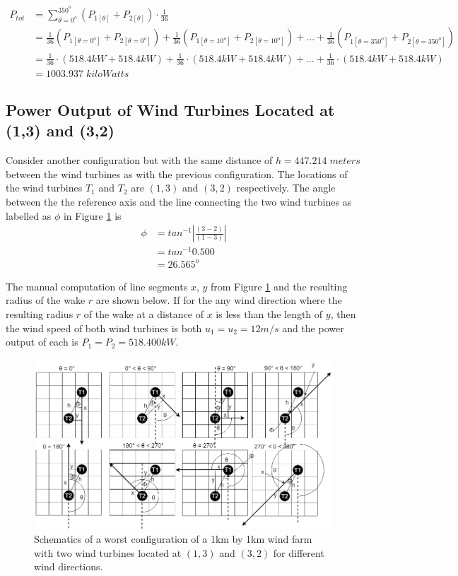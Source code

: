     \begin{align*}
        P_{tot}
        &= \sum_{\theta=0^o}^{350^o} \left( P_{1[\theta]} + P_{2[\theta]} \right) \cdot \frac{1}{36} \\
        &= \frac{1}{36}\left( P_{1[\theta=0^o]} + P_{2[\theta=0^o]} \right) + \frac{1}{36}\left( P_{1[\theta=10^o]} + P_{2[\theta=10^o]} \right) +...+ \frac{1}{36}\left( P_{1[\theta=350^o]} + P_{2[\theta=350^o]} \right) \\
        &= \frac{1}{36}\cdot\left( 518.4kW + 518.4kW \right) + \frac{1}{36}\cdot\left( 518.4kW + 518.4kW \right) +...+ \frac{1}{36}\cdot\left(  518.4kW + 518.4kW \right) \\
        &=1003.937\;kiloWatts
    \end{align*}
    
\subsection{Power Output of Wind Turbines Located at (1,3) and (3,2)}   
    Consider another configuration but with the same distance of $h=447.214\;meters$ between the wind turbines as with the previous configuration. The locations of the wind turbines $T_1$ and $T_2$ are $(1,3)$ and $(3,2)$ respectively. The angle between the the reference axis and the line connecting the two wind turbines as labelled as $\phi$ in Figure \ref{sampleSmall5} is
    \begin{align*}
    	\phi
    	&=tan^{-1}\left| \frac{(3-2)}{(1-3)} \right| \\
    	&=tan^{-1} 0.500 \\
    	&=26.565^o
    \end{align*}
    
    The manual computation of line segments $x$, $y$ from Figure \ref{sampleSmall5} and the resulting radius of the wake $r$ are shown below. If for the any wind direction where the resulting radius $r$ of the wake at a distance of $x$ is less than the length of $y$, then the wind speed of both wind turbines is both $u_1=u_2=12m/s$ and the power output of each is $P_1=P_2=518.400kW$.
    
    \begin{figure}[H]
        \centering
        \includegraphics[width=\linewidth]{Figures/1332.png}
        \caption{Schematics of a worst configuration of a 1km by 1km wind farm with two wind turbines located at $(1,3)$ and $(3,2)$ for different wind directions.}
        \label{sampleSmall5}
    \end{figure}
    
